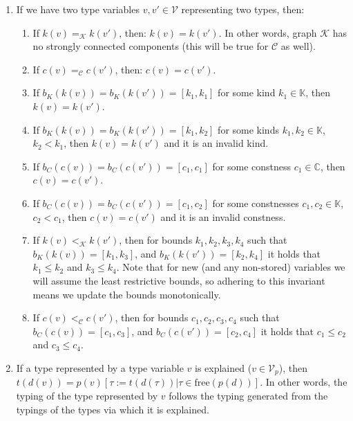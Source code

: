 \begin{defn}
\begin{enumerate}
        \item \label{invG} If we have two type variables $v, v' \in \mathcal{V}$ representing two types, then:
            \begin{enumerate}
                \item If $k (v) =_{\mathcal{K}} k (v')$, then: $k (v) = k(v')$. In other words, graph $\mathcal{K}$ has no strongly connected components (this will be true for $\mathcal{C}$ as well).
                \item If $c (v) =_{\mathcal{C}} c (v')$, then: $c (v) = c(v')$.
                \item If $b_K (k (v)) = b_K (k (v')) = [k_1, k_1]$ for some kind $k_1 \in \mathbb{K}$, then $k (v) = k (v')$.
                \item If $b_K (k (v)) = b_K (k (v')) = [k_1, k_2]$ for some kinds $k_1, k_2 \in \mathbb{K}$, $k_2 < k_1$, then $k (v) = k (v')$ and it is an invalid kind.
                \item If $b_C (c (v)) = b_C (c (v')) = [c_1, c_1]$ for some constness $c_1 \in \mathbb{C}$, then $c (v) = c (v')$.
                \item If $b_C (c (v)) = b_C (c (v')) = [c_1, c_2]$ for some constnesses $c_1, c_2 \in \mathbb{K}$, $c_2 < c_1$, then $c (v) = c (v')$ and it is an invalid constness.
                \item If $k (v) <_{\mathcal{K}} k (v')$, then for bounds $k_1, k_2, k_3, k_4$ such that $b_K (k (v)) = [k_1, k_3]$, and $b_K (k (v')) = [k_2, k_4]$ it holds that $k_1 \leq k_2$ and $k_3 \leq k_4$. Note that for new (and any non-stored) variables we will assume the least restrictive bounds, so adhering to this invariant means we update the bounds monotonically.
                \item If $c (v) <_{\mathcal{C}} c (v')$, then for bounds $c_1, c_2, c_3, c_4$ such that $b_C (c (v)) = [c_1, c_3]$, and $b_C (c (v')) = [c_2, c_4]$ it holds that $c_1 \leq c_2$ and $c_3 \leq c_4$.
            \end{enumerate}

        \item If a type represented by a type variable $v$ is explained ($v \in \mathcal{V}_p$), then $t (d (v)) = p(v) \left[ \tau := t (d (\tau)) | \tau \in \mathrm{free} (p (d))\right]$. In other words, the typing of the type represented by $v$ follows the typing generated from the typings of the types via which it is explained. \label{invT}
    \end{enumerate}
\end{defn}

